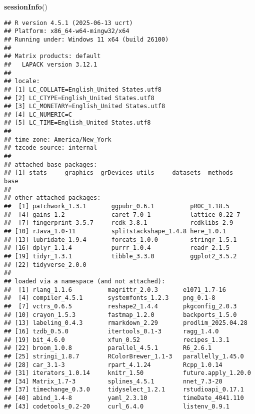 \documentclass[
]{article}
\newenvironment{Shaded}{\begin{snugshade}}{\end{snugshade}}
\newcommand{\FunctionTok}[1]{\textcolor[rgb]{0.13,0.29,0.53}{\textbf{#1}}}
\newcommand{\NormalTok}[1]{#1}
\begin{document}
\begin{Shaded}
\begin{Highlighting}[]
\FunctionTok{sessionInfo}\NormalTok{()}
\end{Highlighting}
\end{Shaded}

\begin{verbatim}
## R version 4.5.1 (2025-06-13 ucrt)
## Platform: x86_64-w64-mingw32/x64
## Running under: Windows 11 x64 (build 26100)
## 
## Matrix products: default
##   LAPACK version 3.12.1
## 
## locale:
## [1] LC_COLLATE=English_United States.utf8 
## [2] LC_CTYPE=English_United States.utf8   
## [3] LC_MONETARY=English_United States.utf8
## [4] LC_NUMERIC=C                          
## [5] LC_TIME=English_United States.utf8    
## 
## time zone: America/New_York
## tzcode source: internal
## 
## attached base packages:
## [1] stats     graphics  grDevices utils     datasets  methods   base     
## 
## other attached packages:
##  [1] patchwork_1.3.1       ggpubr_0.6.1          pROC_1.18.5          
##  [4] gains_1.2             caret_7.0-1           lattice_0.22-7       
##  [7] fingerprint_3.5.7     rcdk_3.8.1            rcdklibs_2.9         
## [10] rJava_1.0-11          splitstackshape_1.4.8 here_1.0.1           
## [13] lubridate_1.9.4       forcats_1.0.0         stringr_1.5.1        
## [16] dplyr_1.1.4           purrr_1.0.4           readr_2.1.5          
## [19] tidyr_1.3.1           tibble_3.3.0          ggplot2_3.5.2        
## [22] tidyverse_2.0.0      
## 
## loaded via a namespace (and not attached):
##  [1] rlang_1.1.6          magrittr_2.0.3       e1071_1.7-16        
##  [4] compiler_4.5.1       systemfonts_1.2.3    png_0.1-8           
##  [7] vctrs_0.6.5          reshape2_1.4.4       pkgconfig_2.0.3     
## [10] crayon_1.5.3         fastmap_1.2.0        backports_1.5.0     
## [13] labeling_0.4.3       rmarkdown_2.29       prodlim_2025.04.28  
## [16] tzdb_0.5.0           itertools_0.1-3      ragg_1.4.0          
## [19] bit_4.6.0            xfun_0.52            recipes_1.3.1       
## [22] broom_1.0.8          parallel_4.5.1       R6_2.6.1            
## [25] stringi_1.8.7        RColorBrewer_1.1-3   parallelly_1.45.0   
## [28] car_3.1-3            rpart_4.1.24         Rcpp_1.0.14         
## [31] iterators_1.0.14     knitr_1.50           future.apply_1.20.0 
## [34] Matrix_1.7-3         splines_4.5.1        nnet_7.3-20         
## [37] timechange_0.3.0     tidyselect_1.2.1     rstudioapi_0.17.1   
## [40] abind_1.4-8          yaml_2.3.10          timeDate_4041.110   
## [43] codetools_0.2-20     curl_6.4.0           listenv_0.9.1       

\end{verbatim}
\end{document}
